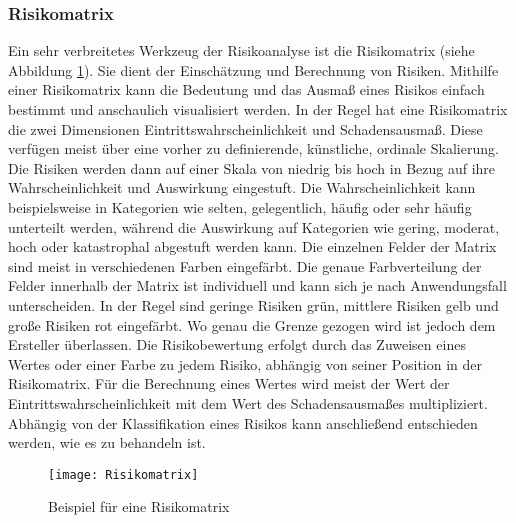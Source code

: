 \subsubsection{Risikomatrix}
Ein sehr verbreitetes Werkzeug der Risikoanalyse ist die Risikomatrix (siehe Abbildung \ref{fig:Risikomatrix}). Sie dient der Einschätzung und Berechnung von Risiken. Mithilfe einer Risikomatrix kann die Bedeutung und das Ausmaß eines Risikos einfach bestimmt und anschaulich visualisiert werden. In der Regel hat eine Risikomatrix die zwei Dimensionen Eintrittswahrscheinlichkeit und Schadensausmaß. Diese verfügen meist über eine vorher zu definierende, künstliche, ordinale Skalierung. Die Risiken werden dann auf einer Skala von niedrig bis hoch in Bezug auf ihre Wahrscheinlichkeit und Auswirkung eingestuft. Die Wahrscheinlichkeit kann beispielsweise in Kategorien wie selten, gelegentlich, häufig oder sehr häufig unterteilt werden, während die Auswirkung auf Kategorien wie gering, moderat, hoch oder katastrophal abgestuft werden kann. Die einzelnen Felder der Matrix sind meist in verschiedenen Farben eingefärbt. Die genaue Farbverteilung der Felder innerhalb der Matrix ist individuell und kann sich je nach Anwendungsfall unterscheiden. In der Regel sind geringe Risiken grün, mittlere Risiken gelb und große Risiken rot eingefärbt. Wo genau die Grenze gezogen wird ist jedoch dem Ersteller überlassen.
Die Risikobewertung erfolgt durch das Zuweisen eines Wertes oder einer Farbe zu jedem Risiko, abhängig von seiner Position in der Risikomatrix. Für die Berechnung eines Wertes wird meist der Wert der Eintrittswahrscheinlichkeit mit dem Wert des Schadensausmaßes multipliziert. Abhängig von der Klassifikation eines Risikos kann anschließend entschieden werden, wie es zu behandeln ist.
\\

\begin{figure}[H]
\centering
\texttt{[image: Risikomatrix]}
\label{fig:Risikomatrix}
\caption{Beispiel für eine Risikomatrix}
\end{figure}


